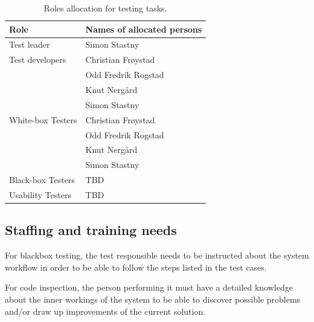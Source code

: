 \documentclass[11pt]{book}
\begin{document}
\begin{table}[H]
    \centering
    \begin{tabular}{| l | l |}
        \hline
        Role                & Names of allocated persons    \\ \hline

        Test leader         & Simon Stastny                 \\ \hline

        Test developers     & Christian Frøystad            \\
                            & Odd Fredrik Rogstad           \\
                            & Knut Nergård                  \\
                            & Simon Stastny                 \\ \hline

        White-box Testers   & Christian Frøystad            \\
                            & Odd Fredrik Rogstad           \\
                            & Knut Nergård                  \\
                            & Simon Stastny                 \\ \hline

        Black-box Testers   & TBD                           \\ \hline %

        Usability Testers   & TBD                           \\ \hline %
    \end{tabular}
    \caption{Roles allocation for testing tasks.}
    \label{tab:test_plan_roles_allocation}
\end{table}

\subsection{Staffing and training needs}
For blackbox testing, the test responsible needs to be instructed about the system workflow in order to be able to follow the steps listed in the test cases.

For code inspection, the person performing it must have a detailed knowledge about the inner workings of the system to be able to discover possible problems and/or draw up improvements of the current solution.
\end{document}
